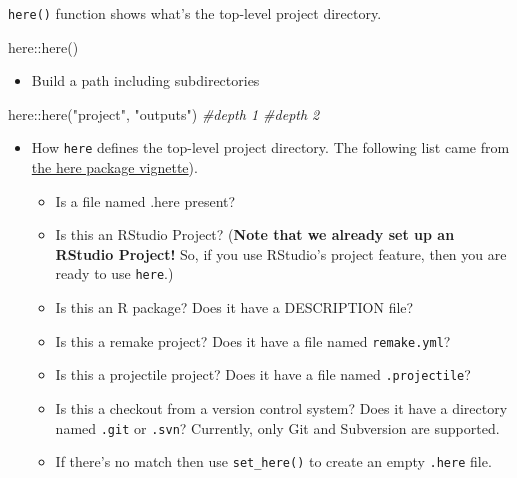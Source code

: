 \documentclass[
]{book}
\newenvironment{Shaded}{\begin{snugshade}}{\end{snugshade}}
\newcommand{\CommentTok}[1]{\textcolor[rgb]{0.56,0.35,0.01}{\textit{#1}}}
\newcommand{\FunctionTok}[1]{\textcolor[rgb]{0.00,0.00,0.00}{#1}}
\newcommand{\NormalTok}[1]{#1}
\newcommand{\SpecialCharTok}[1]{\textcolor[rgb]{0.00,0.00,0.00}{#1}}
\newcommand{\StringTok}[1]{\textcolor[rgb]{0.31,0.60,0.02}{#1}}
\providecommand{\tightlist}{%
  \setlength{\itemsep}{0pt}\setlength{\parskip}{0pt}}
\begin{document}
\texttt{here()} function shows what's the top-level project directory.

\begin{Shaded}
\begin{Highlighting}[]
\NormalTok{here}\SpecialCharTok{::}\FunctionTok{here}\NormalTok{()}
\end{Highlighting}
\end{Shaded}

\begin{itemize}
\tightlist
\item
  Build a path including subdirectories
\end{itemize}

\begin{Shaded}
\begin{Highlighting}[]
\NormalTok{here}\SpecialCharTok{::}\FunctionTok{here}\NormalTok{(}\StringTok{"project"}\NormalTok{, }\StringTok{"outputs"}\NormalTok{)}
           \CommentTok{\#depth 1   \#depth 2}
\end{Highlighting}
\end{Shaded}

\begin{itemize}
\item
  How \texttt{here} defines the top-level project directory. The following list came from \href{https://GitHub.com/jennybc/here_here}{the here package vignette}).

  \begin{itemize}
  \item
    Is a file named .here present?
  \item
    Is this an RStudio Project? (\textbf{Note that we already set up an RStudio Project!} So, if you use RStudio's project feature, then you are ready to use \texttt{here}.)
  \item
    Is this an R package? Does it have a DESCRIPTION file?
  \item
    Is this a remake project? Does it have a file named \texttt{remake.yml}?
  \item
    Is this a projectile project? Does it have a file named \texttt{.projectile}?
  \item
    Is this a checkout from a version control system? Does it have a directory named \texttt{.git} or \texttt{.svn}? Currently, only Git and Subversion are supported.
  \item
    If there's no match then use \texttt{set\_here()} to create an empty \texttt{.here} file.
  \end{itemize}
\end{itemize}
\end{document}

